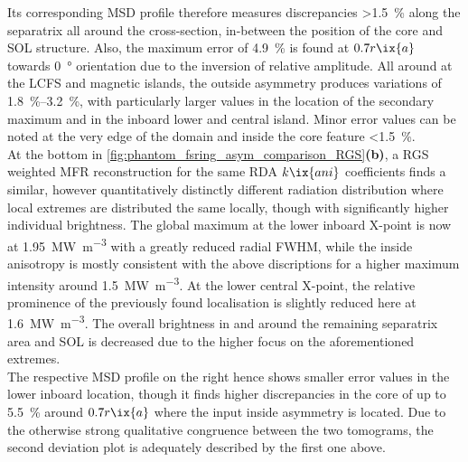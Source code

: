                 Its corresponding MSD profile therefore measures discrepancies >\SI{1.5}{\percent} along the separatrix all around the cross-section, in-between the position of the core and SOL structure. Also, the maximum error of \SI{4.9}{\percent} is found at $0.7r\ix{a}$ towards \SI{0}{\degree} orientation due to the inversion of relative amplitude. All around at the LCFS and magnetic islands, the outside asymmetry produces variations of \SIrange{1.8}{3.2}{\percent}, with particularly larger values in the location of the secondary maximum and in the inboard lower and central island. Minor error values can be noted at the very edge of the domain and inside the core feature <\SI{1.5}{\percent}.\\%
                At the bottom in \cref{fig:phantom_fsring_asym_comparison_RGS}\textbf{(b)}, a RGS weighted MFR reconstruction for the same RDA $k\ix{ani}$ coefficients finds a similar, however quantitatively distinctly different radiation distribution where local extremes are distributed the same locally, though with significantly higher individual brightness. The global maximum at the lower inboard X-point is now at \SI{1.95}{\mega\watt\per\cubic\meter} with a greatly reduced radial FWHM, while the inside anisotropy is mostly consistent with the above discriptions for a higher maximum intensity around \SI{1.5}{\mega\watt\per\cubic\meter}. At the lower central X-point, the relative prominence of the previously found localisation is slightly reduced here at \SI{1.6}{\mega\watt\per\cubic\meter}. The overall brightness in and around the remaining separatrix area and SOL is decreased due to the higher focus on the aforementioned extremes.\\%
                The respective MSD profile on the right hence shows smaller error values in the lower inboard location, though it finds higher discrepancies in the core of up to \SI{5.5}{\percent} around $0.7r\ix{a}$ where the input inside asymmetry is located. Due to the otherwise strong qualitative congruence between the two tomograms, the second deviation plot is adequately described by the first one above.\\%
%
